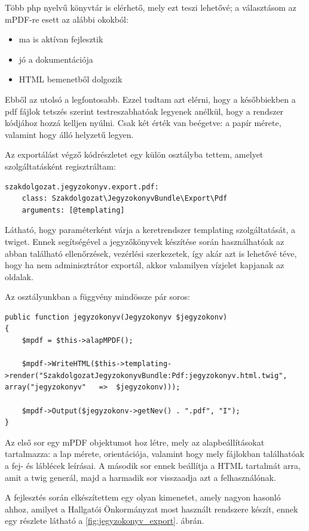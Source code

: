 \documentclass[a4paper,12pt,oneside]{report}
\begin{document}
Több php nyelvű könyvtár is elérhető, mely ezt teszi lehetővé; a választásom az mPDF-re esett az alábbi okokból:

\begin{itemize}
    \item ma is aktívan fejlesztik
    \item jó a dokumentációja
    \item HTML bemenetből dolgozik
\end{itemize}

Ebből az utolsó a legfontosabb. Ezzel tudtam azt elérni, hogy a későbbiekben a pdf fájlok tetszés szerint testreszabhatóak legyenek anélkül, hogy a rendszer kódjához hozzá kelljen nyúlni. Csak két érték van beégetve: a papír mérete, valamint hogy álló helyzetű legyen.

Az exportálást végző kódrészletet egy külön osztályba tettem, amelyet szolgáltatásként regisztráltam:

\begin{lstlisting}
szakdolgozat.jegyzokonyv.export.pdf:
    class: Szakdolgozat\JegyzokonyvBundle\Export\Pdf
    arguments: [@templating]
\end{lstlisting}

Látható, hogy paraméterként várja a keretrendszer templating szolgáltatását, a twiget. Ennek segítségével a jegyzőkönyvek készítése során használhatóak az abban található ellenőrzések, vezérlési szerkezetek, így akár azt is lehetővé téve, hogy ha nem adminisztrátor exportál, akkor valamilyen vízjelet kapjanak az oldalak.

Az osztályunkban a függvény mindössze pár soros:

\begin{lstlisting}
public function jegyzokonyv(Jegyzokonyv $jegyzokonv)
{
    $mpdf = $this->alapMPDF();

    $mpdf->WriteHTML($this->templating->render("SzakdolgozatJegyzokonyvBundle:Pdf:jegyzokonyv.html.twig", array("jegyzokonyv"   =>  $jegyzokonv)));

    $mpdf->Output($jegyzokonv->getNev() . ".pdf", "I");
}
\end{lstlisting}

Az első sor egy mPDF objektumot hoz létre, mely az alapbeállításokat tartalmazza: a lap mérete, orientációja, valamint hogy mely fájlokban találhatóak a fej- és láblécek leírásai. A második sor ennek beállítja a HTML tartalmát arra, amit a twig generál, majd a harmadik sor visszaadja azt a felhasználónak.

A fejlesztés során elkészítettem egy olyan kimenetet, amely nagyon hasonló ahhoz, amilyet a Hallgatói Önkormányzat most használt rendszere készít, ennek egy részlete látható a \ref{fig:jegyzokonyv_export}. ábrán.
\end{document}
